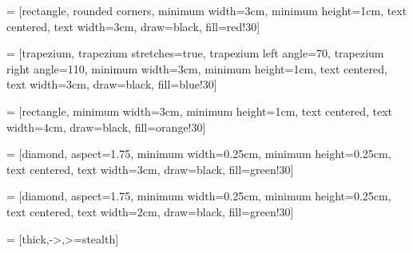 
 = [rectangle, rounded corners,
minimum width=3cm,
minimum height=1cm,
text centered,
text width=3cm,
draw=black,
fill=red!30]

 = [trapezium,
trapezium stretches=true, %
trapezium left angle=70,
trapezium right angle=110,
minimum width=3cm,
minimum height=1cm,
text centered,
text width=3cm,
draw=black, fill=blue!30]

 = [rectangle,
minimum width=3cm,
minimum height=1cm,
text centered,
text width=4cm,
draw=black,
fill=orange!30]

 = [diamond,
aspect=1.75,
minimum width=0.25cm,
minimum height=0.25cm,
text centered,
text width=3cm,
draw=black,
fill=green!30]

 = [diamond,
aspect=1.75,
minimum width=0.25cm,
minimum height=0.25cm,
text centered,
text width=2cm,
draw=black,
fill=green!30]

 = [thick,->,>=stealth]

